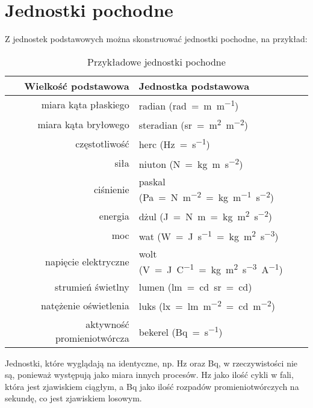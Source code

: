 \documentclass{article}
\begin{document}
\section{Jednostki pochodne}
Z jednostek podstawowych można skonstruować jednostki pochodne, na przykład:
\begin{table}[H]
\centering
\begin{tabular}{rl}
\toprule
Wielkość podstawowa & Jednostka podstawowa \\
\midrule
miara kąta płaskiego & radian (\unit{\radian=\m\per\m}) \\
miara kąta bryłowego & steradian (\unit{\steradian=\m\squared\per\m\squared}) \\
częstotliwość & herc (\unit{\Hz=\s^{-1}}) \\
siła & niuton (\unit{\newton=\kg.\m.\s^{-2}}) \\
ciśnienie & paskal (\unit{\pascal=\newton\per\metre\squared=\kg.\m^{-1}.\s^{-2}}) \\
energia & dżul (\unit{\J=\newton.\m=\kg.\m^{2}.\s^{-2}}) \\
moc & wat (\unit{\watt=\joule\per\s=\kg.\m^{2}.\s^{-3}}) \\
napięcie elektryczne & wolt (\unit{\volt=\joule\per\coulomb=\kg.\m^{2}.\s^{-3}.\A^{-1}}) \\
strumień świetlny & lumen (\unit{\lumen=\candela.\steradian=\candela}) \\
natężenie oświetlenia & luks (\unit{\lux=\lumen\per\m\squared=\candela.\m^{-2}}) \\
aktywność promieniotwórcza & bekerel (\unit{\becquerel=\s^{-1}}) \\
\bottomrule
\end{tabular}
\caption{Przykładowe jednostki pochodne}
\end{table}
Jednostki, które wyglądają na identyczne, np. \unit{\hertz} oraz \unit{\becquerel}, w rzeczywistości nie są, ponieważ występują jako miara innych procesów. \unit{\hertz} jako ilość cykli w fali, która jest zjawiskiem ciągłym, a \unit{\becquerel} jako ilość rozpadów promieniotwórczych na sekundę, co jest zjawiskiem losowym. \par
\end{document}
